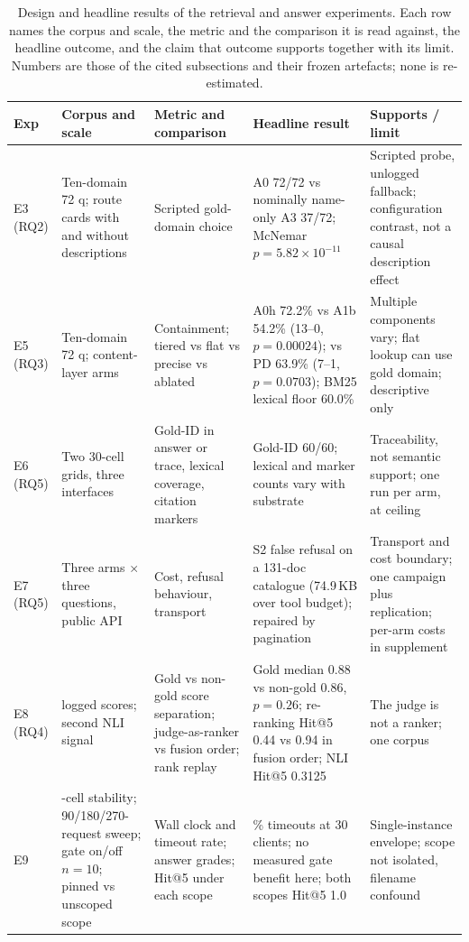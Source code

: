 \documentclass[final,5p,times,twocolumn]{elsarticle}
\begin{document}
\begin{table}[t]
\centering
\footnotesize
\setlength{\tabcolsep}{4pt}
\caption{Design and headline results of the retrieval and answer experiments.
Each row names the corpus and scale, the metric and the comparison it is read
against, the headline outcome, and the claim that outcome supports together
with its limit. Numbers are those of the cited subsections and their frozen
artefacts; none is re-estimated.}
\label{tab:retrieval-design}
\begin{tabular}{@{}>{\raggedright\arraybackslash}p{}>{\raggedright\arraybackslash}p{}>{\raggedright\arraybackslash}p{}>{\raggedright\arraybackslash}p{}>{\raggedright\arraybackslash}p{}@{}}
\toprule
Exp & Corpus and scale & Metric and comparison & Headline result & Supports / limit\\
\midrule
E3 (RQ2) & Ten-domain 72 q; route cards with and without descriptions & Scripted gold-domain choice & A0 72/72 vs nominally name-only A3 37/72; McNemar $p=5.82\times10^{-11}$ & Scripted probe, unlogged fallback; configuration contrast, not a causal description effect\\
E5 (RQ3) & Ten-domain 72 q; content-layer arms & Containment; tiered vs flat vs precise vs ablated & A0h 72.2\% vs A1b 54.2\% (13--0, $p=0.00024$); vs PD 63.9\% (7--1, $p=0.0703$); BM25 lexical floor 60.0\% & Multiple components vary; flat lookup can use gold domain; descriptive only\\
E6 (RQ5) & Two 30-cell grids, three interfaces & Gold-ID in answer or trace, lexical coverage, citation markers & Gold-ID 60/60; lexical and marker counts vary with substrate & Traceability, not semantic support; one run per arm, at ceiling\\
E7 (RQ5) & Three arms $\times$ three questions, public API & Cost, refusal behaviour, transport & S2 false refusal on a 131-doc catalogue (74.9\,KB over tool budget); repaired by pagination & Transport and cost boundary; one campaign plus replication; per-arm costs in supplement\\
E8 (RQ4) & 191 logged scores; second NLI signal & Gold vs non-gold score separation; judge-as-ranker vs fusion order; rank replay & Gold median 0.88 vs non-gold 0.86, $p=0.26$; re-ranking Hit@5 0.44 vs 0.94 in fusion order; NLI Hit@5 0.3125 & The judge is not a ranker; one corpus\\
E9 & 27-cell stability; 90/180/270-request sweep; gate on/off $n=10$; pinned vs unscoped scope & Wall clock and timeout rate; answer grades; Hit@5 under each scope & 41\% timeouts at 30 clients; no measured gate benefit here; both scopes Hit@5 1.0 & Single-instance envelope; scope not isolated, filename confound\\
\bottomrule
\end{tabular}
\end{table}
\end{document}
